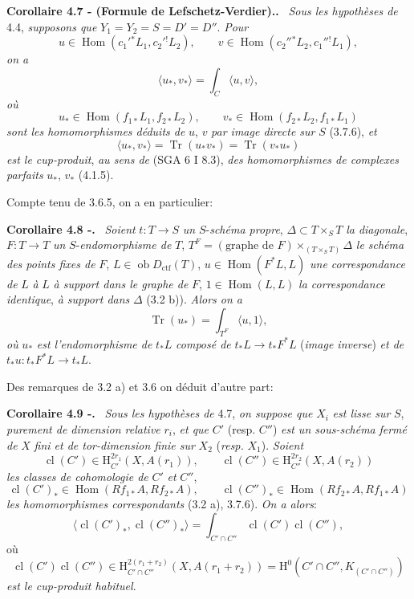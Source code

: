 \documentclass[11pt]{article}
\newenvironment{statement}[1]{\par\medskip\noindent\textbf{#1.}\ }{\par\medskip}
\renewcommand{\H}{\mathrm{H}}
\DeclareMathOperator{\Hom}{Hom}
\newcommand{\ob}{\operatorname{ob}}
\providecommand{\Dctf}{D_{\mathrm{ctf}}}
\providecommand{\cl}{\operatorname{cl}}
\providecommand{\Tr}{\operatorname{Tr}}
\providecommand{\Tr}{\operatorname{Tr}}
\providecommand{\Dctf}{D_{\mathrm{ctf}}}
\providecommand{\Tr}{\operatorname{Tr}}
\providecommand{\Hom}{\operatorname{Hom}}
\providecommand{\ob}{\operatorname{ob}}
\providecommand{\Tr}{\operatorname{Tr}}
\providecommand{\cl}{\operatorname{cl}}
\providecommand{\Hom}{\operatorname{Hom}}
\providecommand{\cl}{\operatorname{cl}}
\providecommand{\Tr}{\operatorname{Tr}}
\begin{document}
\begin{statement}{Corollaire 4.7 - (Formule de Lefschetz-Verdier).}
\emph{Sous les hypothèses de} 4.4, \emph{supposons que} $Y_1=Y_2=S=D'=D''$. \emph{Pour}
\[
u\in\Hom(c_1'{}^*L_1,c_2'{}^!L_2),\qquad
v\in\Hom(c_2''{}^*L_2,c_1''{}^!L_1),
\]
\emph{on a}
\begin{equation}
\tag{4.7.1}
\langle u_*,v_*\rangle=\int_C\langle u,v\rangle,
\end{equation}
\emph{où}
\[
u_*\in\Hom(f_{1*}L_1,f_{2*}L_2),\qquad
v_*\in\Hom(f_{2*}L_2,f_{1*}L_1)
\]
\emph{sont les homomorphismes déduits de} $u$, $v$ \emph{par image directe sur} $S$ (3.7.6), \emph{et}
\[
\langle u_*,v_*\rangle=\Tr(u_*v_*)=\Tr(v_*u_*)
\]
\emph{est le cup-produit}, \emph{au sens de} (SGA 6 I 8.3), \emph{des homomorphismes de complexes parfaits} $u_*$, $v_*$ (4.1.5).
\end{statement}

Compte tenu de 3.6.5, on a en particulier:

\begin{statement}{Corollaire 4.8 -}
\emph{Soient} $t:T\longrightarrow S$ \emph{un} $S$-\emph{schéma propre}, $\Delta\subset T\times_S T$ \emph{la diagonale}, $F:T\longrightarrow T$ \emph{un} $S$-\emph{endomorphisme de} $T$, $T^F=(\text{graphe de }F)\times_{(T\times_S T)}\Delta$ \emph{le schéma des points fixes de} $F$, $L\in\ob\Dctf(T)$, $u\in\Hom(F^*L,L)$ \emph{une correspondance de} $L$ \emph{à} $L$ \emph{à support dans le graphe de} $F$, $1\in\Hom(L,L)$ \emph{la correspondance identique}, \emph{à support dans} $\Delta$ (3.2 b)). \emph{Alors on a}
\[
\Tr(u_*)=\int_{T^F}\langle u,1\rangle,
\]
\emph{où} $u_*$ \emph{est l'endomorphisme de} $t_*L$ \emph{composé de} $t_*L\longrightarrow t_*F^*L$ (\emph{image inverse}) \emph{et de} $t_*u:t_*F^*L\longrightarrow t_*L$.
\end{statement}

Des remarques de 3.2 a) et 3.6 on déduit d'autre part:

\begin{statement}{Corollaire 4.9 -}
\emph{Sous les hypothèses de} 4.7, \emph{on suppose que} $X_i$ \emph{est lisse sur} $S$, \emph{purement de dimension relative} $r_i$, \emph{et que} $C'$ (resp. $C''$) \emph{est un sous-schéma}
\emph{fermé de} $X$ \emph{fini et de tor-dimension finie sur} $X_2$ (\emph{resp.} $X_1$). \emph{Soient}
\[
\cl(C')\in \H_{C'}^{2r_1}(X,A(r_1)),\qquad
\cl(C'')\in \H_{C''}^{2r_2}(X,A(r_2))
\]
\emph{les classes de cohomologie de} $C'$ \emph{et} $C''$,
\[
\cl(C')_*\in\Hom(Rf_{1*}A,Rf_{2*}A),\qquad
\cl(C'')_*\in\Hom(Rf_{2*}A,Rf_{1*}A)
\]
\emph{les homomorphismes correspondants} (3.2 a), 3.7.6). \emph{On a alors}:
\[
\langle \cl(C')_*,\cl(C'')_*\rangle
=
\int_{C'\cap C''}\cl(C')\cl(C''),
\]
où
\[
\cl(C')\cl(C'')\in
\H_{C'\cap C''}^{2(r_1+r_2)}(X,A(r_1+r_2))
=
\H^0(C'\cap C'',K_{(C'\cap C'')})
\]
\emph{est le cup-produit habituel}.
\end{statement}
\end{document}
